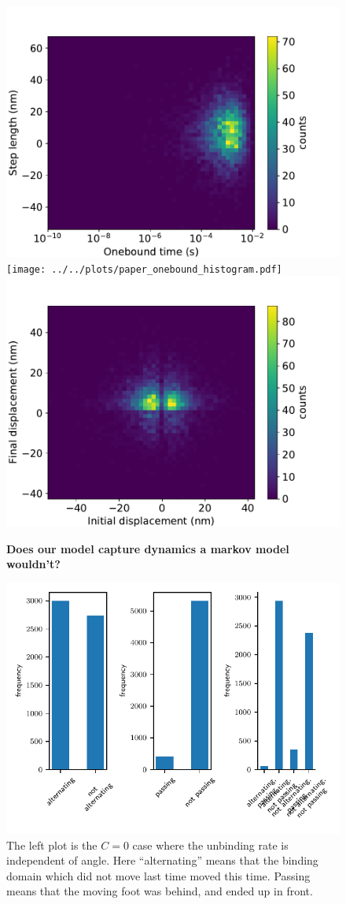 \documentclass[9pt,twocolumn,twoside]{pnas-new}
\begin{document}
\begin{figure}[tbhp]
  \centering
  \includegraphics[width=0.5\linewidth]{../../plots/paper_onebound_vs_steplength.pdf}
  \texttt{[image: ../../plots/paper\_onebound\_histogram.pdf]}
  \includegraphics[width=0.5\linewidth]{../../plots/paper_initial_vs_final_displacement.pdf}
\caption{\textbf{Does our model capture dynamics a markov model wouldn't?}}
\label{fig:}
\end{figure}

\begin{figure}[tbhp]
    \includegraphics[width=0.5\linewidth]{../../plots/paper_foot_order_histogram.pdf}
\caption{The left plot is the $C=0$ case where the unbinding rate is
  independent of angle.  Here ``alternating'' means that the binding
  domain which did not move last time moved this time.  Passing means
  that the moving foot was behind, and ended up in front.}
\label{fig:steppingorder}
\end{figure}
\end{document}
